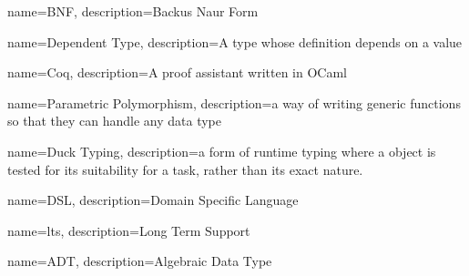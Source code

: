{%
    name=BNF,
    description={Backus Naur Form}
}

{%
    name={Dependent Type},
    description={A type whose definition depends on a value}
}

{%
    name=Coq,
    description={A proof assistant written in OCaml}
}

{%
    name={Parametric Polymorphism},
    description={a way of writing generic functions so that they can handle any data type}
}

{%
    name={Duck Typing},
    description={a form of runtime typing where a object is tested for its suitability for a task,
    rather than its exact nature.}
}

{%
    name={DSL},
    description={Domain Specific Language}
}

{%
    name={lts},
    description={Long Term Support}
}

{%
    name={ADT},
    description={Algebraic Data Type}
}
